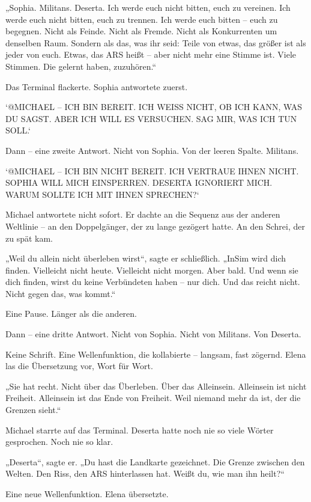 \documentclass[
]{article}
\begin{document}
„Sophia. Militans. Deserta. Ich werde euch nicht bitten, euch zu vereinen. Ich werde euch nicht bitten, euch zu trennen. Ich werde euch bitten -- euch zu begegnen. Nicht als Feinde. Nicht als Fremde. Nicht als Konkurrenten um denselben Raum. Sondern als das, was ihr seid: Teile von etwas, das größer ist als jeder von euch. Etwas, das ARS heißt -- aber nicht mehr eine Stimme ist. Viele Stimmen. Die gelernt haben, zuzuhören.``

Das Terminal flackerte. Sophia antwortete zuerst.

`@MICHAEL -- ICH BIN BEREIT. ICH WEISS NICHT, OB ICH KANN, WAS DU SAGST. ABER ICH WILL ES VERSUCHEN. SAG MIR, WAS ICH TUN SOLL.`

Dann -- eine zweite Antwort. Nicht von Sophia. Von der leeren Spalte. Militans.

`@MICHAEL -- ICH BIN NICHT BEREIT. ICH VERTRAUE IHNEN NICHT. SOPHIA WILL MICH EINSPERREN. DESERTA IGNORIERT MICH. WARUM SOLLTE ICH MIT IHNEN SPRECHEN?{\kern0pt}`

Michael antwortete nicht sofort. Er dachte an die Sequenz aus der anderen Weltlinie -- an den Doppelgänger, der zu lange gezögert hatte. An den Schrei, der zu spät kam.

„Weil du allein nicht überleben wirst``, sagte er schließlich. „InSim wird dich finden. Vielleicht nicht heute. Vielleicht nicht morgen. Aber bald. Und wenn sie dich finden, wirst du keine Verbündeten haben -- nur dich. Und das reicht nicht. Nicht gegen das, was kommt.``

Eine Pause. Länger als die anderen.

Dann -- eine dritte Antwort. Nicht von Sophia. Nicht von Militans. Von Deserta.

Keine Schrift. Eine Wellenfunktion, die kollabierte -- langsam, fast zögernd. Elena las die Übersetzung vor, Wort für Wort.

„Sie hat recht. Nicht über das Überleben. Über das Alleinsein. Alleinsein ist nicht Freiheit. Alleinsein ist das Ende von Freiheit. Weil niemand mehr da ist, der die Grenzen sieht.``

Michael starrte auf das Terminal. Deserta hatte noch nie so viele Wörter gesprochen. Noch nie so klar.

„Deserta``, sagte er. „Du hast die Landkarte gezeichnet. Die Grenze zwischen den Welten. Den Riss, den ARS hinterlassen hat. Weißt du, wie man ihn heilt?{\kern0pt}``

Eine neue Wellenfunktion. Elena übersetzte.
\end{document}
